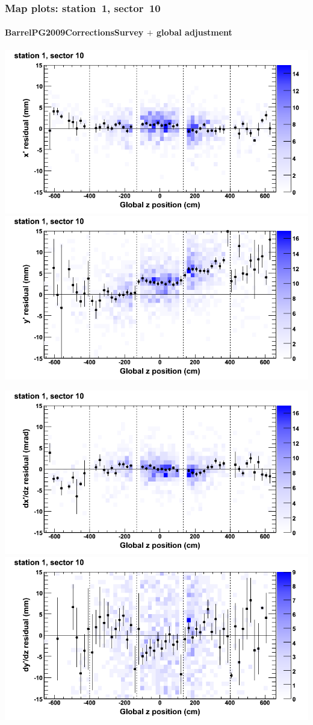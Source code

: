 \documentclass[compress]{beamer}
\begin{document}
\begin{frame}
\frametitle{Map plots: station~1, sector~10}
\framesubtitle{BarrelPG2009CorrectionsSurvey $+$ global adjustment}
\includegraphics[width=0.5\linewidth]{mapplots_re01/DTvsz_st1sec10_x.png}
\includegraphics[width=0.5\linewidth]{mapplots_re01/DTvsz_st1sec10_y.png}

\includegraphics[width=0.5\linewidth]{mapplots_re01/DTvsz_st1sec10_dxdz.png}
\includegraphics[width=0.5\linewidth]{mapplots_re01/DTvsz_st1sec10_dydz.png}
\end{frame}
\end{document}
